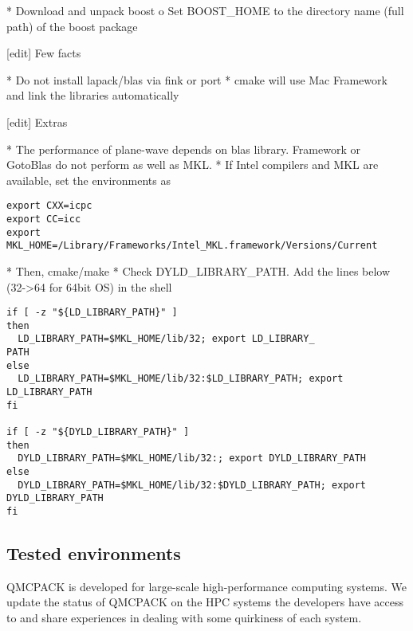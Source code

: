     * Download and unpack boost
          o Set BOOST\_HOME to the directory name (full path) of the boost package 

[edit] Few facts

    * Do not install lapack/blas via fink or port
    * cmake will use Mac Framework and link the libraries automatically 

[edit] Extras

    * The performance of plane-wave depends on blas library. Framework or GotoBlas do not perform as well as MKL.
    * If Intel compilers and MKL are available, set the environments as 

\begin{verbatim}
export CXX=icpc
export CC=icc
export MKL_HOME=/Library/Frameworks/Intel_MKL.framework/Versions/Current
\end{verbatim}

    * Then, cmake/make
    * Check DYLD\_LIBRARY\_PATH. Add the lines below (32->64 for 64bit OS) in the shell 

\begin{verbatim}
if [ -z "${LD_LIBRARY_PATH}" ]
then
  LD_LIBRARY_PATH=$MKL_HOME/lib/32; export LD_LIBRARY_
PATH
else
  LD_LIBRARY_PATH=$MKL_HOME/lib/32:$LD_LIBRARY_PATH; export LD_LIBRARY_PATH
fi

if [ -z "${DYLD_LIBRARY_PATH}" ]
then
  DYLD_LIBRARY_PATH=$MKL_HOME/lib/32:; export DYLD_LIBRARY_PATH
else
  DYLD_LIBRARY_PATH=$MKL_HOME/lib/32:$DYLD_LIBRARY_PATH; export DYLD_LIBRARY_PATH
fi
\end{verbatim}

\subsection{Tested environments}
QMCPACK is developed for large-scale high-performance computing systems. We update the status of QMCPACK on the HPC systems the developers have access to and share experiences in dealing with some quirkiness of each system.

